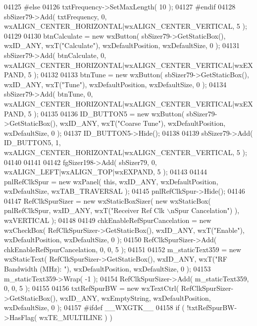\begin{DoxyCode}
04125 \textcolor{preprocessor}{    #else}
04126     txtFrequency->SetMaxLength( 10 );
04127 \textcolor{preprocessor}{    #endif}
04128     sbSizer79->Add( txtFrequency, 0, wxALIGN\_CENTER\_HORIZONTAL|wxALIGN\_CENTER\_VERTICAL, 5 );
04129     
04130     btnCalculate = \textcolor{keyword}{new} wxButton( sbSizer79->GetStaticBox(), wxID\_ANY, wxT(\textcolor{stringliteral}{"Calculate"}), wxDefaultPosition, 
      wxDefaultSize, 0 );
04131     sbSizer79->Add( btnCalculate, 0, wxALIGN\_CENTER\_HORIZONTAL|wxALIGN\_CENTER\_VERTICAL|wxEXPAND, 5 );
04132     
04133     btnTune = \textcolor{keyword}{new} wxButton( sbSizer79->GetStaticBox(), wxID\_ANY, wxT(\textcolor{stringliteral}{"Tune"}), wxDefaultPosition, 
      wxDefaultSize, 0 );
04134     sbSizer79->Add( btnTune, 0, wxALIGN\_CENTER\_HORIZONTAL|wxALIGN\_CENTER\_VERTICAL|wxEXPAND, 5 );
04135     
04136     ID_BUTTON5 = \textcolor{keyword}{new} wxButton( sbSizer79->GetStaticBox(), wxID\_ANY, wxT(\textcolor{stringliteral}{"Coarse Tune"}), wxDefaultPosition, 
      wxDefaultSize, 0 );
04137     ID_BUTTON5->Hide();
04138     
04139     sbSizer79->Add( ID_BUTTON5, 1, wxALIGN\_CENTER\_HORIZONTAL|wxALIGN\_CENTER\_VERTICAL, 5 );
04140     
04141     
04142     fgSizer198->Add( sbSizer79, 0, wxALIGN\_LEFT|wxALIGN\_TOP|wxEXPAND, 5 );
04143     
04144     pnlRefClkSpur = \textcolor{keyword}{new} wxPanel( \textcolor{keyword}{this}, wxID\_ANY, wxDefaultPosition, wxDefaultSize, wxTAB\_TRAVERSAL );
04145     pnlRefClkSpur->Hide();
04146     
04147     RefClkSpurSizer = \textcolor{keyword}{new} wxStaticBoxSizer( \textcolor{keyword}{new} wxStaticBox( pnlRefClkSpur, wxID\_ANY, wxT(\textcolor{stringliteral}{"Receiver Ref Clk
          \(\backslash\)nSpur Cancelation"}) ), wxVERTICAL );
04148     
04149     chkEnableRefSpurCancelation = \textcolor{keyword}{new} wxCheckBox( RefClkSpurSizer->GetStaticBox(), wxID\_ANY, wxT(\textcolor{stringliteral}{"Enable"}),
       wxDefaultPosition, wxDefaultSize, 0 );
04150     RefClkSpurSizer->Add( chkEnableRefSpurCancelation, 0, 0, 5 );
04151     
04152     m_staticText359 = \textcolor{keyword}{new} wxStaticText( RefClkSpurSizer->GetStaticBox(), wxID\_ANY, wxT(\textcolor{stringliteral}{"RF Bandwidth (MHz):
      "}), wxDefaultPosition, wxDefaultSize, 0 );
04153     m_staticText359->Wrap( -1 );
04154     RefClkSpurSizer->Add( m_staticText359, 0, 0, 5 );
04155     
04156     txtRefSpurBW = \textcolor{keyword}{new} wxTextCtrl( RefClkSpurSizer->GetStaticBox(), wxID\_ANY, wxEmptyString, 
      wxDefaultPosition, wxDefaultSize, 0 );
04157 \textcolor{preprocessor}{    #ifdef \_\_WXGTK\_\_}
04158     \textcolor{keywordflow}{if} ( !txtRefSpurBW->HasFlag( wxTE\_MULTILINE ) )

\end{DoxyCode}
